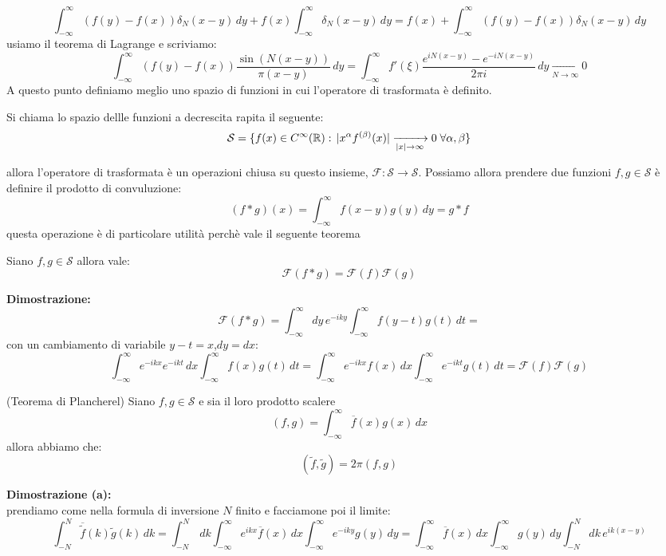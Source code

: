 \[\int_{-\infty}^\infty (f(y)-f(x))\delta_N(x-y)\,dy +  f(x) \int_{-\infty}^\infty\delta_N(x-y)\,dy  =  f(x) + \int_{-\infty}^\infty (f(y)-f(x))\delta_N(x-y)\,dy \]
usiamo il teorema di Lagrange e scriviamo:
\[\int_{-\infty}^\infty (f(y)-f(x))\frac{\sin(N(x-y))}{\pi (x-y)}\,dy =\int_{-\infty}^\infty f'(\xi) \frac{e^{iN(x-y)}-e^{-iN(x-y)}}{2\pi i}\,dy \xrightarrow[N\to \infty]{} 0 \]
\newline A questo punto definiamo meglio uno spazio di funzioni in cui l'operatore di trasformata è definito.
\begin{dfn}
Si chiama lo spazio dellle funzioni a decrescita rapita il seguente:
\[\mathcal{S} = \{f(x)\in C^\infty(\mathbb{R}):\, |x^\alpha f^{(\beta)}(x)|\xrightarrow[|x|\to \infty]{} 0 \;\forall\alpha,\beta  \}  \]
\end{dfn}
allora l'operatore di trasformata è un operazioni chiusa su questo insieme, $\mathcal{F}:\mathcal{S}\to\mathcal{S}$. Possiamo allora prendere due funzioni $f,g\in \mathcal{S}$ è definire il prodotto di convuluzione:
\[(f*g)(x) = \int_{-\infty}^\infty f(x-y)g(y)\,dy = g*f\]
questa operazione è di particolare utilità perchè vale il seguente teorema
\begin{thm}
Siano $f,g\in \mathcal{S}$ allora vale:
\[\mathcal{F}(f*g) =\mathcal{F}(f)\mathcal{F}(g) \]
\end{thm}
\hspace{-1.6em}\textbf{Dimostrazione:}\\
\[\mathcal{F}(f*g) = \int_{-\infty}^\infty dy\,e^{-iky}\int_{-\infty}^\infty f(y-t)g(t)\,dt = \]
con un cambiamento di variabile $y-t = x$,$dy=dx$:
\[\int_{-\infty}^\infty e^{-ikx}e^{-ikt}\, dx \int_{-\infty}^\infty f(x)g(t)\,dt = \int_{-\infty}^\infty e^{-ikx} f(x)\, dx \int_{-\infty}^\infty e^{-ikt} g(t)\,dt =  \mathcal{F}(f)\mathcal{F}(g)\]
\begin{thm}
(Teorema di Plancherel) Siano $f,g\in \mathcal{S}$ e sia il loro prodotto scalere
\[(f,g) = \int_{-\infty}^\infty\overline{f}(x)g(x)\,dx\]
allora abbiamo che:
\[(\tilde{f},\tilde{g}) = 2\pi(f,g)\]
\end{thm}
\hspace{-1.6em}\textbf{Dimostrazione (a):}\\
prendiamo come nella formula di inversione $N$ finito e facciamone poi il limite:
\[\int_{-N}^N \overline{\tilde{f}}(k) \tilde{g}(k)\,dk = \int_{-N}^N\,dk \int_{-\infty}^\infty e^{ikx} \overline{f}(x)\, dx  \int_{-\infty}^\infty e^{-iky} g(y)\,dy = \int_{-\infty}^\infty \overline{f}(x)\, dx \int_{-\infty}^\infty g(y)\,dy \int_{-N}^Ndk \,e^{ik(x-y)}\]
